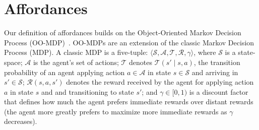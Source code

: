 \documentclass[conference]{IEEEtran}
\newcommand{\dnote}[1]{\textcolor{Green}{\textbf{D: #1}}}
\begin{document}




\section{Affordances}
\label{sec:affordances}

Our definition of affordances builds on the Object-Oriented Markov
Decision Process (OO-MDP)~\citep{diuk08}.  OO-MDPs are an extension of
the classic Markov Decision Process (MDP).  A classic MDP is a
five-tuple: $\langle \mathcal{S}, \mathcal{A}, \mathcal{T},
\mathcal{R}, \gamma \rangle$, where $\mathcal{S}$ is a state-space;
$\mathcal{A}$ is the agent's set of actions; $\mathcal{T}$ denotes
$\mathcal{T}(s' \mid s,a)$, the transition probability of an agent
applying action $a \in \mathcal{A}$ in state $s \in \mathcal{S}$ and
arriving in $s' \in \mathcal{S}$; $\mathcal{R}(s,a,s')$ denotes the
reward received by the agent for applying action $a$ in state $s$ and
and transitioning to state $s'$; and $\gamma \in [0, 1)$ is a discount
  factor that defines how much the agent prefers immediate rewards
  over distant rewards (the agent more greatly prefers to maximize
  more immediate rewards as $\gamma$ decreases).
\end{document}

